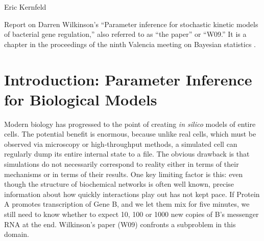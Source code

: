 \documentclass{article}
\newcommand\EMK[1]{\textcolor{purple}{EMK: #1}}
\begin{document}
Eric Kernfeld

Report on Darren Wilkinson's ``Parameter inference for stochastic kinetic models of bacterial gene regulation,'' also referred to as ``the paper'' or ``W09.'' It is a chapter in the proceedings of the ninth Valencia meeting on Bayesian statistics \cite{Bernardo2012}. 

\begin{abstract}
In this paper, Wilkinson attempts to infer reaction rates for biochemical networks in a setting with discrete observations, missing data, and measurement error. He uses vague priors and likelihood-free MCMC methods within a Bayesian model. He runs four main simulations. The first three iterate through successively more difficult and realistic measurement models, and they show the approach can accurately infer three key reaction rates with a useful precision. The fourth studies a naive model, showing it leads to overconfident, incorrect inferences. 

I review some alternative methods in detail and discuss the relative merits of W09's approach. I implement the method in Julia and attempt to reproduce the experiments \EMK{more on this later!}. I assess the method using additional experiments designed to study mixing time, scaling with system size, and prior sensitivity \EMK{more on this later!}. 
\end{abstract}

\tableofcontents
\newpage


\section{Introduction: Parameter Inference for Biological Models}

Modern biology has progressed to the point of creating {\it in silico} models of entire cells. The potential benefit is enormous, because unlike real cells, which must be observed via microscopy or high-throughput methods, a simulated cell can regularly dump its entire internal state to a file. The obvious drawback is that simulations do not necessarily correspond to reality either in terms of their mechanisms or in terms of their results. One key limiting factor is this: even though the structure of biochemical networks is often well known, precise information about how quickly interactions play out has not kept pace. If Protein A promotes transcription of Gene B, and we let them mix for five minutes, we still need to know whether to expect 10, 100 or 1000 new copies of B's messenger RNA at the end. Wilkinson's paper (W09) confronts a subproblem in this domain.
\end{document}
